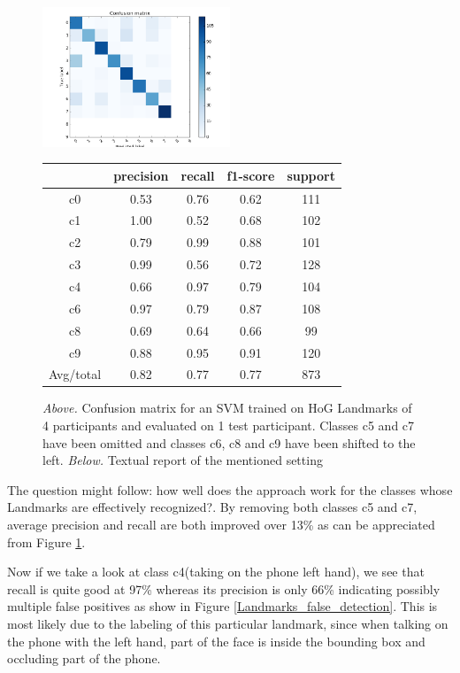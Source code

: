 \documentclass[10pt,twocolumn,letterpaper]{article}
\begin{document}
\begin{figure}[h]
	\centering
	\includegraphics[width=0.5\textwidth]{mult_HOG/4c01234689matComparable}
	\begin{tabular}{c||c|c|c|c}
		& precision&recall&f1-score&support\\	\hline
		c0&0.53&0.76&0.62&111\\
		c1&1.00&0.52&0.68&102\\
		c2&0.79&0.99&0.88&101\\
		c3&0.99&0.56&0.72&128\\
		c4&0.66&0.97&0.79&104\\
		c6&0.97&0.79&0.87&108\\
		c8&0.69&0.64&0.66&99\\
		c9&0.88&0.95&0.91&120\\ \hline
		Avg/total &0.82&0.77& 0.77 &873
	\end{tabular}
	\caption{\textit{Above.} Confusion matrix for an SVM trained on HoG Landmarks of 4 participants and evaluated on 1 test participant. Classes c5 and c7 have been omitted and classes c6, c8 and c9 have been shifted to the left. \textit{Below.} Textual report of the mentioned setting}
	\label{Landmarks_4no5no7}
\end{figure}

The question might follow: how well does the approach work for the classes whose Landmarks are effectively recognized?. By removing both classes c5 and c7, average precision and recall are both improved over 13\% as can be appreciated from Figure \ref{Landmarks_4no5no7}. 

Now if we take a look at class c4(taking on the phone left hand), we see that recall is quite good at 97\% whereas its precision is only 66\% indicating possibly multiple false positives as show in Figure \ref{Landmarks_false_detection}. This is most likely due to the labeling of this particular landmark, since when talking on the phone with the left hand, part of the face is inside the bounding box and occluding part of the phone.
\end{document}
